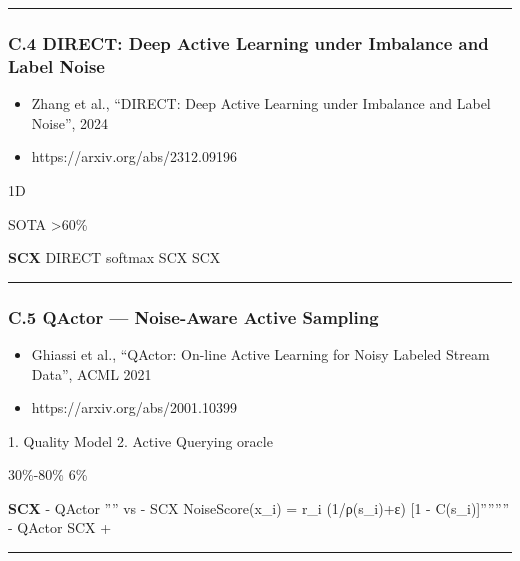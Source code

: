 \documentclass[
  12pt,
]{article}
\providecommand{\tightlist}{%
  \setlength{\itemsep}{0pt}\setlength{\parskip}{0pt}}
\begin{document}
\begin{center}\rule{0.5\linewidth}{0.5pt}\end{center}

\subsubsection{C.4 DIRECT: Deep Active Learning under Imbalance and
Label
Noise}\label{c.4-direct-deep-active-learning-under-imbalance-and-label-noise}

\begin{itemize}
\tightlist
\item
  \textbf{}Zhang et al., ``DIRECT: Deep Active Learning under
  Imbalance and Label Noise'', 2024
\item
  \textbf{}https://arxiv.org/abs/2312.09196
\end{itemize}

\textbf{}

\textbf{}
1D 

\textbf{} SOTA  \textgreater60\%


\textbf{SCX } DIRECT \textbf{}
softmax SCX SCX


\begin{center}\rule{0.5\linewidth}{0.5pt}\end{center}

\subsubsection{C.5 QActor --- Noise-Aware Active
Sampling}\label{c.5-qactor-noise-aware-active-sampling}

\begin{itemize}
\tightlist
\item
  \textbf{}Ghiassi et al., ``QActor: On-line Active Learning for
  Noisy Labeled Stream Data'', ACML 2021
\item
  \textbf{}https://arxiv.org/abs/2001.10399
\end{itemize}

\textbf{}

\textbf{} 1. Quality
Model 2. Active
Querying oracle 

 30\%-80\%  6\%


\textbf{SCX } - QActor '''' vs
 - SCX NoiseScore(x\_i)
= r\_i  (1/ρ(s\_i)+ε)  {[}1 -
C(s\_i){]}'''''''' - QActor
SCX  + 

\begin{center}\rule{0.5\linewidth}{0.5pt}\end{center}
\end{document}

